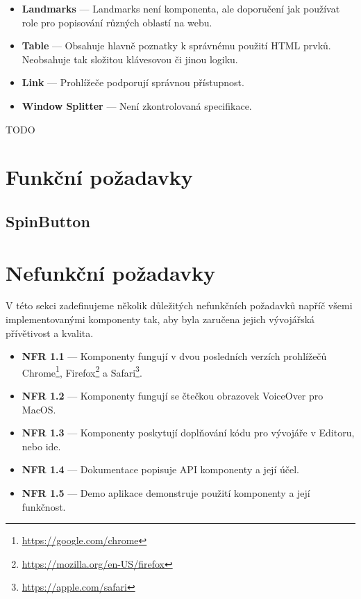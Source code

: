 \begin{itemize}
    \item \textbf{Landmarks} --- Landmarks není komponenta, ale doporučení jak používat role pro popisování různých oblastí na webu.
    \item \textbf{Table} --- Obsahuje hlavně poznatky k správnému použití HTML prvků. Neobsahuje tak složitou klávesovou či jinou logiku.
    \item \textbf{Link} --- Prohlížeče podporují správnou přístupnost.
    \item \textbf{Window Splitter} --- Není zkontrolovaná specifikace.
\end{itemize}

TODO

\section{Funkční požadavky}



\subsection{SpinButton}

\section{Nefunkční požadavky}

V této sekci zadefinujeme několik důležitých nefunkčních požadavků napříč všemi implementovanými komponenty tak, aby byla zaručena jejich vývojářská přívětivost a kvalita.

\begin{itemize}
    \item \textbf{NFR 1.1} --- Komponenty fungují v dvou posledních verzích prohlížečů Chrome\footnote{\url{https://google.com/chrome}}, Firefox\footnote{\url{https://mozilla.org/en-US/firefox}} a Safari\footnote{\url{https://apple.com/safari}}.
    \item \textbf{NFR 1.2} --- Komponenty fungují se čtečkou obrazovek VoiceOver pro MacOS.
    \item \textbf{NFR 1.3} --- Komponenty poskytují doplňování kódu pro vývojáře v Editoru, nebo \gls{ide}.
    \item \textbf{NFR 1.4} --- Dokumentace popisuje API komponenty a její účel.
    \item \textbf{NFR 1.5} --- Demo aplikace demonstruje použití komponenty a její funkčnost.
\end{itemize}

